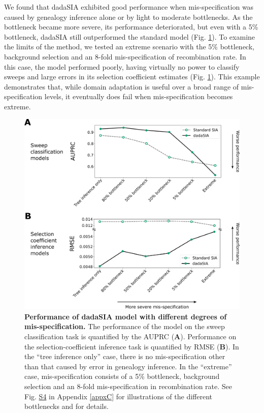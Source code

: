 We found that \ac{dadaSIA} exhibited good performance when mis-specification was caused by genealogy inference alone or by light to moderate bottlenecks. As the bottleneck became more severe, its performance deteriorated, but even with a 5\% bottleneck, \ac{dadaSIA} still outperformed the standard model (Fig. \ref{fig:DA-F5}). To examine the limits of the method, we tested an extreme scenario with the 5\% bottleneck, background selection and an 8-fold mis-specification of recombination rate. In this case, the model performed poorly, having virtually no power to classify sweeps and large errors in its selection coefficient estimates (Fig. \ref{fig:DA-F5}). This example demonstrates that, while domain adaptation is useful over a broad range of mis-specification levels, it eventually does fail when mis-specification becomes extreme.

\begin{figure}
    \centering
    \includegraphics[width=\textwidth]{DA_figs/DA_F5.PNG}
    \caption[Performance of \acf{dadaSIA} model with different degrees of mis-specification.]{\textbf{Performance of \acf{dadaSIA} model with different degrees of mis-specification.} The performance of the model on the sweep classification task is quantified by the \ac{AUPRC} (\textbf{A}). Performance on the selection-coefficient inference task is quantified by \ac{RMSE} (\textbf{B}). In the “tree inference only” case, there is no mis-specification other than that caused by error in genealogy inference. In the “extreme” case, mis-specification consists of a 5\% bottleneck, background selection and an 8-fold mis-specification in recombination rate. See Fig. \href{https://journals.plos.org/plosgenetics/article?id=10.1371/journal.pgen.1011032\#sec018}{S4} in Appendix \ref{appxC} for illustrations of the different bottlenecks and  for details.}
    \label{fig:DA-F5}
\end{figure}

